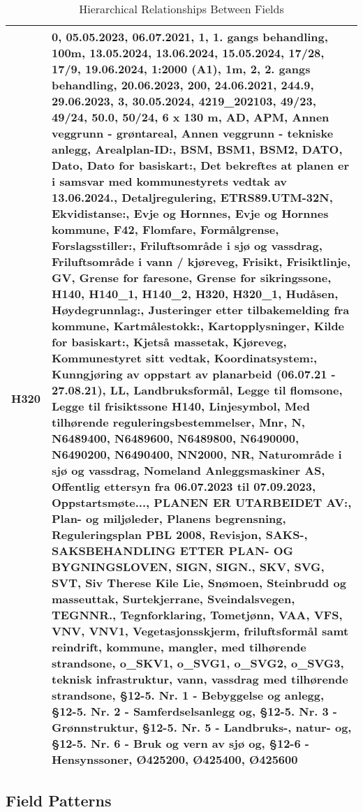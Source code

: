 \begin{table}[h]
\begin{tabular}{l|l}
H320 & 0, 05.05.2023, 06.07.2021, 1, 1. gangs behandling, 100m, 13.05.2024, 13.06.2024, 15.05.2024, 17/28, 17/9, 19.06.2024, 1:2000 (A1), 1m, 2, 2. gangs behandling, 20.06.2023, 200, 24.06.2021, 244.9, 29.06.2023, 3, 30.05.2024, 4219_202103, 49/23, 49/24, 50.0, 50/24, 6 x 130 m, AD, APM, Annen veggrunn - grøntareal, Annen veggrunn - tekniske anlegg, Arealplan-ID:, BSM, BSM1, BSM2, DATO, Dato, Dato for basiskart:, Det bekreftes at planen er i samsvar med kommunestyrets vedtak av 13.06.2024., Detaljregulering, ETRS89.UTM-32N, Ekvidistanse:, Evje og Hornnes, Evje og Hornnes kommune, F42, Flomfare, Formålgrense, Forslagsstiller:, Friluftsområde i sjø og vassdrag, Friluftsområde i vann / kjøreveg, Frisikt, Frisiktlinje, GV, Grense for faresone, Grense for sikringssone, H140, H140_1, H140_2, H320, H320_1, Hudåsen, Høydegrunnlag:, Justeringer etter  tilbakemelding fra kommune, Kartmålestokk:, Kartopplysninger, Kilde for basiskart:, Kjetså massetak, Kjøreveg, Kommunestyret sitt vedtak, Koordinatsystem:, Kunngjøring av oppstart av planarbeid (06.07.21 - 27.08.21), LL, Landbruksformål, Legge til flomsone, Legge til frisiktssone H140, Linjesymbol, Med tilhørende reguleringsbestemmelser, Mnr, N, N6489400, N6489600, N6489800, N6490000, N6490200, N6490400, NN2000, NR, Naturområde i sjø og vassdrag, Nomeland Anleggsmaskiner AS, Offentlig ettersyn fra 06.07.2023 til 07.09.2023, Oppstartsmøte..., PLANEN ER UTARBEIDET AV:, Plan- og miljøleder, Planens begrensning, Reguleringsplan PBL 2008, Revisjon, SAKS-, SAKSBEHANDLING ETTER PLAN- OG BYGNINGSLOVEN, SIGN, SIGN., SKV, SVG, SVT, Siv Therese Kile Lie, Snømoen, Steinbrudd og masseuttak, Surtekjerrane, Sveindalsvegen, TEGNNR., Tegnforklaring, Tometjønn, VAA, VFS, VNV, VNV1, Vegetasjonsskjerm, friluftsformål samt reindrift, kommune, mangler, med tilhørende strandsone, o_SKV1, o_SVG1, o_SVG2, o_SVG3, teknisk infrastruktur, vann, vassdrag med tilhørende strandsone, §12-5. Nr. 1 - Bebyggelse og anlegg, §12-5. Nr. 2 - Samferdselsanlegg og, §12-5. Nr. 3 - Grønnstruktur, §12-5. Nr. 5 - Landbruks-, natur- og, §12-5. Nr. 6 - Bruk og vern av sjø og, §12-6 - Hensynssoner, Ø425200, Ø425400, Ø425600 \\
\hline
\end{tabular}
\caption{Hierarchical Relationships Between Fields}
\end{table}

\subsection{Field Patterns}

